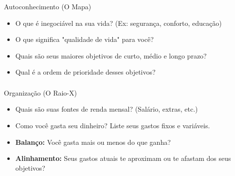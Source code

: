 \begin{frame}[c]
  \frametitle{}

  \begin{block}{\Large \textcolor{blue}{}\quad Autoconhecimento (O Mapa)}

    \begin{itemize}
      \item O que é inegociável na sua vida? (Ex: segurança, conforto, educação) \pause
      \item O que significa "qualidade de vida" para você? \pause
      \item Quais são seus maiores objetivos de curto, médio e longo prazo? \pause
      \item Qual é a ordem de prioridade desses objetivos?
    \end{itemize}
  \end{block}
\end{frame}


\begin{frame}[c]
  \frametitle{}

  \begin{block}{\Large \textcolor{red}{}\quad Organização (O Raio-X)}

    \begin{itemize}
      \item Quais são suas fontes de renda mensal? (Salário, extras, etc.)
      \item Como você gasta seu dinheiro? Liste seus gastos fixos e variáveis.
      \item \textbf{Balanço:} Você gasta mais ou menos do que ganha?
      \item \textbf{Alinhamento:} Seus gastos atuais te aproximam ou te afastam dos seus objetivos?
    \end{itemize}
  \end{block}

\end{frame}


